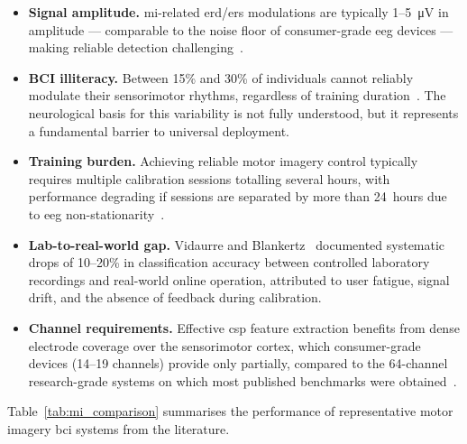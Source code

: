 \begin{itemize}[leftmargin=*]
    \item \textbf{Signal amplitude.} \acrshort{mi}-related
    \acrshort{erd}/\acrshort{ers} modulations are typically
    1--5~\si{\micro\volt} in amplitude — comparable to the noise
    floor of consumer-grade \acrshort{eeg} devices — making reliable
    detection challenging~\cite{lotte2007review}.

    \item \textbf{BCI illiteracy.} Between 15\% and 30\% of
    individuals cannot reliably modulate their sensorimotor rhythms,
    regardless of training duration~\cite{vidaurre2010bci}. The
    neurological basis for this variability is not fully understood,
    but it represents a fundamental barrier to universal deployment.

    \item \textbf{Training burden.} Achieving reliable motor imagery
    control typically requires multiple calibration sessions totalling
    several hours, with performance degrading if sessions are
    separated by more than 24~hours due to \acrshort{eeg}
    non-stationarity~\cite{shenoy2006towards}.

    \item \textbf{Lab-to-real-world gap.} Vidaurre and
    Blankertz~\cite{vidaurre2010bci} documented systematic drops of
    10--20\% in classification accuracy between controlled laboratory
    recordings and real-world online operation, attributed to
    user fatigue, signal drift, and the absence of feedback during
    calibration.

    \item \textbf{Channel requirements.} Effective \acrshort{csp}
    feature extraction benefits from dense electrode coverage over
    the sensorimotor cortex, which consumer-grade devices (14--19
    channels) provide only partially, compared to the 64-channel
    research-grade systems on which most published benchmarks were
    obtained~\cite{blankertz2008csp}.
\end{itemize}

Table~\ref{tab:mi_comparison} summarises the performance of
representative motor imagery \acrshort{bci} systems from the
literature.

